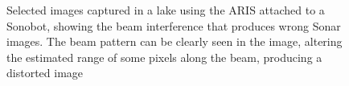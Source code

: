 \begin{figure}
    \caption[Selected images showing beam interference producing wrong Sonar images]{Selected images captured in a lake using the ARIS attached to a Sonobot, showing the beam interference that produces wrong Sonar images. The beam pattern can be clearly seen in the image, altering the estimated range of some pixels along the beam, producing a distorted image}
    \label{md:sonar-beam-interference}
\end{figure}

